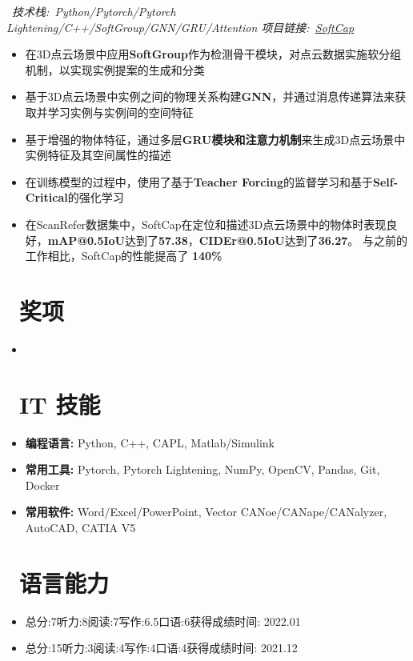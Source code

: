 \documentclass{resume}
\begin{document}
\newpage
{}
\ \textit{技术栈:\ Python/Pytorch/Pytorch Lightening/C++/SoftGroup/GNN/GRU/Attention \hfill 项目链接:\ \href{https://github.com/LuckyMax0722/SoftCap}{SoftCap}}
\begin{itemize}
  \item 在3D点云场景中应用\textbf{SoftGroup}作为检测骨干模块，对点云数据实施软分组机制，以实现实例提案的生成和分类
  \item 基于3D点云场景中实例之间的物理关系构建\textbf{GNN}，并通过消息传递算法来获取并学习实例与实例间的空间特征
  \item 基于增强的物体特征，通过多层\textbf{GRU模块和注意力机制}来生成3D点云场景中实例特征及其空间属性的描述
  \item 在训练模型的过程中，使用了基于\textbf{Teacher Forcing}的监督学习和基于\textbf{Self-Critical}的强化学习
  \item 在ScanRefer数据集中，SoftCap在定位和描述3D点云场景中的物体时表现良好，\textbf{mAP@0.5IoU}达到了\textbf{57.38}，\textbf{CIDEr@0.5IoU}达到了\textbf{36.27}。 与之前的工作相比，SoftCap的性能提高了 \textbf{140\%}
\end{itemize}

\section{\faStar\ 奖项}

\begin{itemize}
  \item {}

\end{itemize}

\section{\faCogs\ IT 技能}

\begin{itemize}
  \item \textbf{编程语言:} Python, C++, CAPL, Matlab/Simulink
  \item \textbf{常用工具:} Pytorch, Pytorch Lightening, NumPy, OpenCV, Pandas, Git, Docker
  \item \textbf{常用软件:} Word/Excel/PowerPoint, Vector CANoe/CANape/CANalyzer, AutoCAD, CATIA V5
\end{itemize}


\section{\faLanguage\ 语言能力}
\begin{itemize}
  \item {}
  {总分:7}{听力:8}{阅读:7}{写作:6.5}{口语:6}{获得成绩时间: 2022.01}

  \item {}
  {总分:15}{听力:3}{阅读:4}{写作:4}{口语:4}{获得成绩时间: 2021.12}
\end{itemize}
\end{document}
